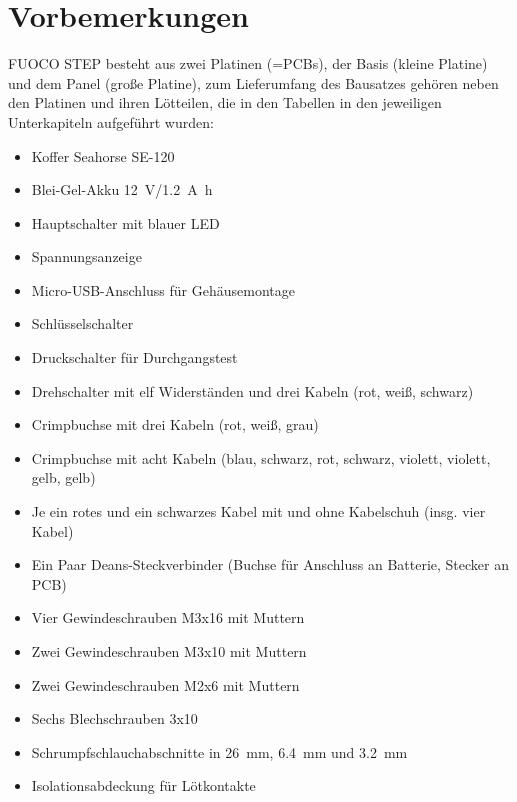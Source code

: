 \documentclass[paper=a4, open=any]{scrbook}
\begin{document}
		\chapter{Vorbemerkungen}
			FUOCO STEP besteht aus zwei Platinen (=PCBs), der Basis (kleine Platine) und dem Panel (große Platine), zum Lieferumfang des Bausatzes gehören neben den Platinen und ihren Lötteilen, die in den Tabellen in den jeweiligen Unterkapiteln aufgeführt wurden:
			\begin{itemize}
				\item Koffer Seahorse SE-120
				\item Blei-Gel-Akku \SI{12}{\volt}/\SI{1,2}{\ampere\hour}
				\item Hauptschalter mit blauer LED
				\item Spannungsanzeige
				\item Micro-USB-Anschluss für Gehäusemontage
				\item Schlüsselschalter
				\item Druckschalter für Durchgangstest
				\item Drehschalter mit elf Widerständen und drei Kabeln (rot, weiß, schwarz)
				\item Crimpbuchse mit drei Kabeln (rot, weiß, grau)
				\item Crimpbuchse mit acht Kabeln (blau, schwarz, rot, schwarz, violett, violett, gelb, gelb)
				\item Je ein rotes und ein schwarzes Kabel mit und ohne Kabelschuh (insg. vier Kabel)
				\item Ein Paar Deans-Steckverbinder (Buchse für Anschluss an Batterie, Stecker an PCB)
				\item Vier Gewindeschrauben M3x16 mit Muttern
				\item Zwei Gewindeschrauben M3x10 mit Muttern
				\item Zwei Gewindeschrauben M2x6 mit Muttern
				\item Sechs Blechschrauben 3x10
				\item Schrumpfschlauchabschnitte in \SI{26}{\milli\metre}, \SI{6,4}{\milli\metre} und \SI{3,2}{\milli\metre}
				\item Isolationsabdeckung für Lötkontakte
			\end{itemize}
\end{document}
